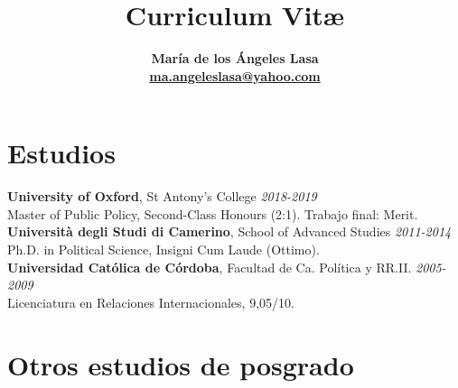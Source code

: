 \documentclass[12pt]{article}
\begin{document}
\title{Curriculum Vit\ae}
\author{\bf María de los Ángeles Lasa \\ \href{mailto:ma.angeleslasa@yahoo.com}{ma.angeleslasa@yahoo.com}}
\date{}

\maketitle

\section*{Estudios}

\begin{rSection}

{\bf University of Oxford}, St Antony's College \hfill {\em 2018-2019} \\ 
Master of Public Policy, Second-Class Honours (2:1). Trabajo final: Merit.\\

{\bf Università degli Studi di Camerino}, School of Advanced Studies \hfill {\em 2011-2014} \\ 
Ph.D. in Political Science, Insigni Cum Laude (Ottimo). \\

{\bf Universidad Católica de Córdoba}, Facultad de Ca. Política y RR.II. \hfill {\em 2005-2009} \\ 
Licenciatura en Relaciones Internacionales, 9,05/10.

\end{rSection}

\section*{Otros estudios de posgrado}
\end{document}
